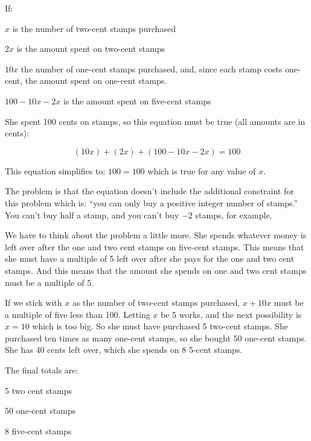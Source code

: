 \documentclass[letterpaper, landscape]{exam}
\begin{document}
  \begin{solution}

    If:
    \begin{itemize*}
      \item $x$ is the number of two-cent stamps purchased
      \item $2x$ is the amount spent on two-cent stamps
      \item $10x$ the number of one-cent stamps purchased, and, since each
        stamp costs one-cent, the amount spent on one-cent stamps.
      \item $100 - 10x - 2x$ is the amount spent on five-cent stamps
    \end{itemize*}

    She spent 100 cents on stamps, so this equation must be true (all amounts
    are in cents):

    \[
      (10x) + (2x) + (100 - 10x - 2x) = 100 
    \]

    This equation simplifies to: $100 = 100$ which is true for any value of $x$.  

    The problem is that the equation doesn't include the additional constraint
    for this problem which is: ``you can only buy a positive integer number of
    stamps.''  You can't buy half a stamp, and you can't buy $-2$ stamps, for
    example.

    We have to think about the problem a little more.  She spends whatever
    money is left over after the one and two cent stamps on five-cent stamps.
    This means that she must have a multiple of 5 left over after she pays for
    the one and two cent stamps.  And this means that the amount she spends on
    one and two cent stamps must be a multiple of 5.  

    If we stick with $x$ as the number of two-cent stamps purchased, $x + 10x$
    must be a multiple of five less than 100.  Letting $x$ be 5 works, and the
    next possibility is $x=10$ which is too big.  So she must have purchased 5
    two-cent stamps.  She purchased ten times as many one-cent stamps, so she
    bought 50 one-cent stamps.  She has 40 cents left over, which she spends on
    8 5-cent stamps.  
    
    The final totals are:
    \begin{itemize*}
      \item 5 two cent stamps
      \item 50 one-cent stamps
      \item 8 five-cent stamps
    \end{itemize*}

  \end{solution}
\end{document}
